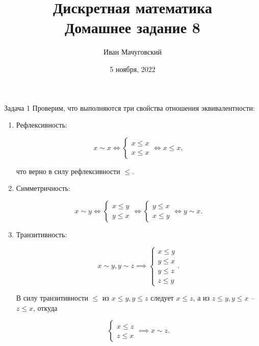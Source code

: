 \documentclass{article}
\date{5 ноября, 2022}
\title{Дискретная математика \\ \Large Домашнее задание 8}
\author{Иван Мачуговский}
\begin{document}
	\maketitle

	\begin{section}{Задача 1}
		Проверим, что выполняются три свойства отношения эквивалентности:

		\begin{enumerate}
			\item Рефлексивность:

			\begin{equation*}
				x \sim x \iff \begin{cases}
					x \le x \\
					x \le x
				\end{cases} \iff x \le x,
			\end{equation*}

			что верно в силу рефлексивности $\le$.

			\item Симметричность:

			\begin{equation*}
				x \sim y \iff \begin{cases}
					x \le y \\
					y \le x
				\end{cases} \iff \begin{cases}
					y \le x \\
					x \le y
				\end{cases} \iff y \sim x.
			\end{equation*}

			\item Транзитивность:

			\begin{equation*}
				x \sim y, y \sim z \implies \begin{cases}
					x \le y \\
					y \le x \\
					y \le z \\
					z \le y
				\end{cases}.
			\end{equation*}

			В силу транзитивности $\le$ из $x \le y, y \le z$ следует $x \le z$, а из $z \le y, y \le x$ -- $z \le x$, откуда

			\begin{equation*}
				\begin{cases}
					x \le z \\
					z \le x
				\end{cases} \implies x \sim z.
			\end{equation*}
		\end{enumerate}
	\end{section}
\end{document}
